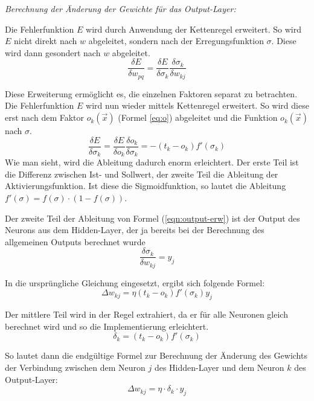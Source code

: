 \emph{Berechnung der Änderung der Gewichte für das Output-Layer:}

Die Fehlerfunktion $E$ wird durch Anwendung der Kettenregel erweitert. So wird $E$ nicht direkt nach $w$ abgeleitet, sondern nach der Erregungsfunktion $\sigma$. Diese wird dann gesondert nach $w$ abgeleitet.
\begin{equation}
\frac{\delta E}{\delta w_{pq}} = \frac{\delta E}{\delta \sigma_{k}} \frac{\delta \sigma_{k}}{\delta w_{kj}}
\label{eqn:output-erw}
\end{equation}

Diese Erweiterung ermöglicht es, die einzelnen Faktoren separat zu betrachten. Die Fehlerfunktion $E$ wird nun wieder mittels Kettenregel erweitert. So wird diese erst nach dem Faktor $o_k(\vec{x})$ (Formel \ref{eq:o}) abgeleitet und die Funktion $o_k(\vec{x})$ nach $\sigma$.
\begin{equation}
\frac{\delta E}{\delta \sigma_{k}} = \frac{\delta E}{\delta o_{k}} \frac{\delta o_k}{\delta \sigma_k} = -(t_k - o_k) f'(\sigma_k)
\end{equation}
Wie man sieht, wird die Ableitung dadurch enorm erleichtert. Der erste Teil ist die Differenz zwischen Ist- und Sollwert, der zweite Teil die Ableitung der Aktivierungsfunktion. Ist diese die Sigmoidfunktion, so lautet die Ableitung $f'(\sigma)=f(\sigma)\cdot (1-f(\sigma))$.

Der zweite Teil der Ableitung von Formel (\ref{eqn:output-erw})  ist der Output des Neurons aus dem Hidden-Layer, der ja bereits bei der Berechnung des allgemeinen Outputs berechnet wurde
\begin{equation}
\frac{\delta\sigma_k}{\delta w_{kj}}=y_j
\end{equation}

In die ursprüngliche Gleichung eingesetzt, ergibt sich folgende Formel:
\begin{equation}
\Delta w_{kj} = \eta (t_k - o_k) f'(\sigma_k)y_j
\end{equation}

Der mittlere Teil wird in der Regel extrahiert, da er für alle Neuronen gleich berechnet wird und so die Implementierung erleichtert.
\begin{equation}
\delta_k = (t_k - o_k) f'(\sigma_k)
\end{equation}

So lautet dann die endgültige Formel zur Berechnung der Änderung des Gewichts der Verbindung zwischen dem Neuron $j$ des Hidden-Layer und dem Neuron $k$ des Output-Layer:
\begin{equation}
\Delta w_{kj} = \eta\cdot \delta_k \cdot y_j
\end{equation}

